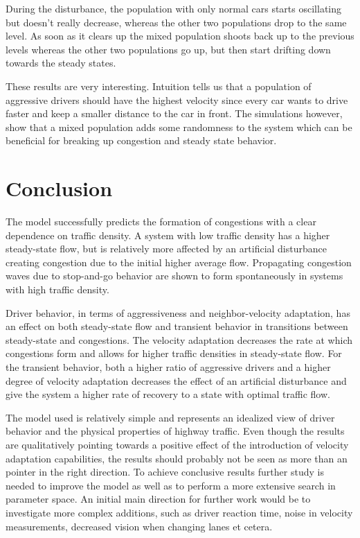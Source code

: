 \documentclass[11pt,a4paper,twocolumn]{article}
\begin{document}
During the disturbance, the population with only normal cars starts oscillating but doesn't really decrease, whereas the other two populations drop to the same level. As soon as it clears up the mixed population shoots back up to the previous levels whereas the other two populations go up, but then start drifting down towards the steady states.

These results are very interesting. Intuition tells us that a population of aggressive drivers should have the highest velocity since every car wants to drive faster and keep a smaller distance to the car in front. The simulations however, show that a mixed population adds some randomness to the system which can be beneficial for breaking up congestion and steady state behavior.

\section{Conclusion}
The model successfully predicts the formation of congestions with a clear dependence on traffic density. A system with low traffic density has a higher steady-state flow, but is relatively more affected by an artificial disturbance creating congestion due to the initial higher average flow. Propagating congestion waves due to stop-and-go behavior are shown to form spontaneously in systems with high traffic density.

Driver behavior, in terms of aggressiveness and neighbor-velocity adaptation, has an effect on both steady-state flow and transient behavior in transitions between steady-state and congestions. The velocity adaptation decreases the rate at which congestions form and allows for higher traffic densities in steady-state flow. For the transient behavior, both a higher ratio of aggressive drivers and a higher degree of velocity adaptation decreases the effect of an artificial disturbance and give the system a higher rate of recovery to a state with optimal traffic flow.

The model used is relatively simple and represents an idealized view of driver behavior and the physical properties of highway traffic. Even though the results are qualitatively pointing towards a positive effect of the introduction of velocity adaptation capabilities, the results should probably not be seen as more than an pointer in the right direction. To achieve conclusive results further study is needed to improve the model as well as to perform a more extensive search in parameter space. An initial main direction for further work would be to investigate more complex additions, such as driver reaction time, noise in velocity measurements, decreased vision when changing lanes et cetera.
\end{document}
